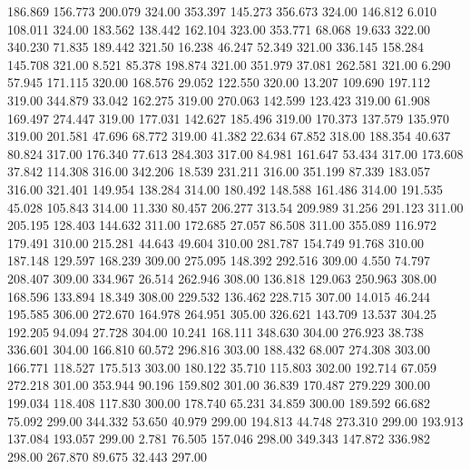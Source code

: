  186.869  156.773  200.079       324.00
 353.397  145.273  356.673       324.00
 146.812    6.010  108.011       324.00
 183.562  138.442  162.104       323.00
 353.771   68.068   19.633       322.00
 340.230   71.835  189.442       321.50
  16.238   46.247   52.349       321.00
 336.145  158.284  145.708       321.00
   8.521   85.378  198.874       321.00
 351.979   37.081  262.581       321.00
   6.290   57.945  171.115       320.00
 168.576   29.052  122.550       320.00
  13.207  109.690  197.112       319.00
 344.879   33.042  162.275       319.00
 270.063  142.599  123.423       319.00
  61.908  169.497  274.447       319.00
 177.031  142.627  185.496       319.00
 170.373  137.579  135.970       319.00
 201.581   47.696   68.772       319.00
  41.382   22.634   67.852       318.00
 188.354   40.637   80.824       317.00
 176.340   77.613  284.303       317.00
  84.981  161.647   53.434       317.00
 173.608   37.842  114.308       316.00
 342.206   18.539  231.211       316.00
 351.199   87.339  183.057       316.00
 321.401  149.954  138.284       314.00
 180.492  148.588  161.486       314.00
 191.535   45.028  105.843       314.00
  11.330   80.457  206.277       313.54
 209.989   31.256  291.123       311.00
 205.195  128.403  144.632       311.00
 172.685   27.057   86.508       311.00
 355.089  116.972  179.491       310.00
 215.281   44.643   49.604       310.00
 281.787  154.749   91.768       310.00
 187.148  129.597  168.239       309.00
 275.095  148.392  292.516       309.00
   4.550   74.797  208.407       309.00
 334.967   26.514  262.946       308.00
 136.818  129.063  250.963       308.00
 168.596  133.894   18.349       308.00
 229.532  136.462  228.715       307.00
  14.015   46.244  195.585       306.00
 272.670  164.978  264.951       305.00
 326.621  143.709   13.537       304.25
 192.205   94.094   27.728       304.00
  10.241  168.111  348.630       304.00
 276.923   38.738  336.601       304.00
 166.810   60.572  296.816       303.00
 188.432   68.007  274.308       303.00
 166.771  118.527  175.513       303.00
 180.122   35.710  115.803       302.00
 192.714   67.059  272.218       301.00
 353.944   90.196  159.802       301.00
  36.839  170.487  279.229       300.00
 199.034  118.408  117.830       300.00
 178.740   65.231   34.859       300.00
 189.592   66.682   75.092       299.00
 344.332   53.650   40.979       299.00
 194.813   44.748  273.310       299.00
 193.913  137.084  193.057       299.00
   2.781   76.505  157.046       298.00
 349.343  147.872  336.982       298.00
 267.870   89.675   32.443       297.00

